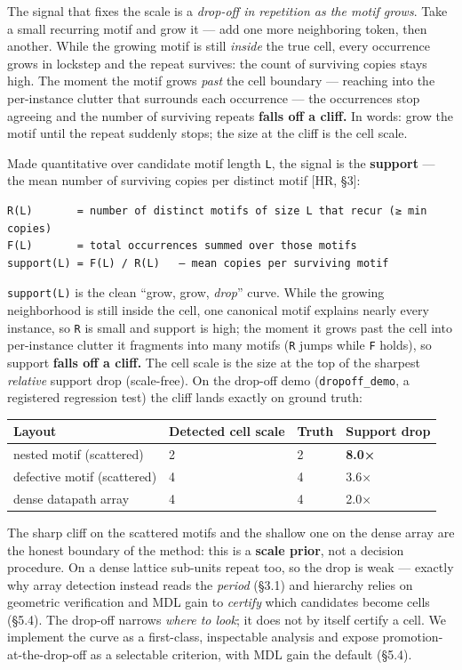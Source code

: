 \documentclass[
  11pt,
]{article}
\newcounter{none} %
\begin{document}
The signal that fixes the scale is a \emph{drop-off in repetition as the
motif grows}. Take a small recurring motif and grow it --- add one more
neighboring token, then another. While the growing motif is still
\emph{inside} the true cell, every occurrence grows in lockstep and the
repeat survives: the count of surviving copies stays high. The moment
the motif grows \emph{past} the cell boundary --- reaching into the
per-instance clutter that surrounds each occurrence --- the occurrences
stop agreeing and the number of surviving repeats \textbf{falls off a
cliff.} In words: grow the motif until the repeat suddenly stops; the
size at the cliff is the cell scale.

Made quantitative over candidate motif length \texttt{L}, the signal is
the \textbf{support} --- the mean number of surviving copies per
distinct motif {[}HR, §3{]}:

\begin{verbatim}
R(L)       = number of distinct motifs of size L that recur (≥ min copies)
F(L)       = total occurrences summed over those motifs
support(L) = F(L) / R(L)   — mean copies per surviving motif
\end{verbatim}

\texttt{support(L)} is the clean ``grow, grow, \emph{drop}'' curve.
While the growing neighborhood is still inside the cell, one canonical
motif explains nearly every instance, so \texttt{R} is small and support
is high; the moment it grows past the cell into per-instance clutter it
fragments into many motifs (\texttt{R} jumps while \texttt{F} holds), so
support \textbf{falls off a cliff.} The cell scale is the size at the
top of the sharpest \emph{relative} support drop (scale-free). On the
drop-off demo (\texttt{dropoff\_demo}, a registered regression test) the
cliff lands exactly on ground truth:

{\def\LTcaptype{none} %
\begin{longtable}[]{@{}llll@{}}
\toprule\noalign{}
Layout & Detected cell scale & Truth & Support drop \\
\midrule\noalign{}
\endhead
\bottomrule\noalign{}
\endlastfoot
nested motif (scattered) & 2 & 2 & \textbf{8.0×} \\
defective motif (scattered) & 4 & 4 & 3.6× \\
dense datapath array & 4 & 4 & 2.0× \\
\end{longtable}
}

The sharp cliff on the scattered motifs and the shallow one on the dense
array are the honest boundary of the method: this is a \textbf{scale
prior}, not a decision procedure. On a dense lattice sub-units repeat
too, so the drop is weak --- exactly why array detection instead reads
the \emph{period} (§3.1) and hierarchy relies on geometric verification
and MDL gain to \emph{certify} which candidates become cells (§5.4). The
drop-off narrows \emph{where to look}; it does not by itself certify a
cell. We implement the curve as a first-class, inspectable analysis and
expose promotion-at-the-drop-off as a selectable criterion, with MDL
gain the default (§5.4).
\end{document}

